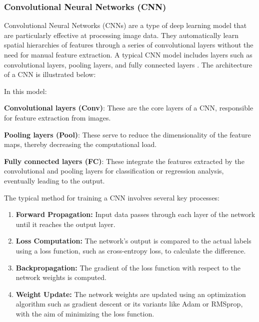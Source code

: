 \subsubsection{Convolutional Neural Networks (CNN)}

Convolutional Neural Networks (CNNs) are a type of deep learning model that are particularly effective at processing image data. They automatically learn spatial hierarchies of features through a series of convolutional layers without the need for manual feature extraction. A typical CNN model includes layers such as convolutional layers, pooling layers, and fully connected layers \cite{3.4}. The architecture of a CNN is illustrated below:



In this model:

\textbf{Convolutional layers (Conv)}: These are the core layers of a CNN, responsible for feature extraction from images.

\textbf{Pooling layers (Pool)}: These serve to reduce the dimensionality of the feature maps, thereby decreasing the computational load.

\textbf{Fully connected layers (FC)}: These integrate the features extracted by the convolutional and pooling layers for classification or regression analysis, eventually leading to the output.

The typical method for training a CNN involves several key processes:

\begin{enumerate}
    \item \textbf{Forward Propagation:} Input data passes through each layer of the network until it reaches the output layer.
    \item \textbf{Loss Computation:} The network's output is compared to the actual labels using a loss function, such as cross-entropy loss, to calculate the difference.
    \item \textbf{Backpropagation:} The gradient of the loss function with respect to the network weights is computed.
    \item \textbf{Weight Update:} The network weights are updated using an optimization algorithm such as gradient descent or its variants like Adam or RMSprop, with the aim of minimizing the loss function.
\end{enumerate}

